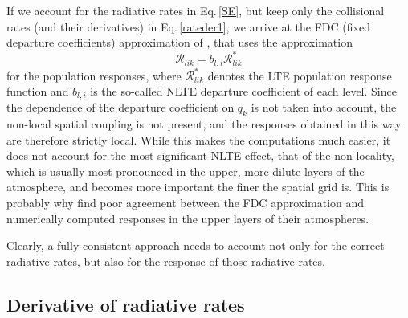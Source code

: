 \documentclass{aa}
\begin{document}
If we account for the radiative rates in Eq.\,\ref{SE}, but keep only the collisional rates (and their derivatives) in Eq.\,\ref{rateder1}, we arrive at the FDC (fixed departure coefficients) approximation of \citet{HectorI}, that uses the approximation
\begin{equation}
{\mathcal R}_{lik} = b_{l,i}  {\mathcal R}^*_{lik}
\end{equation}
for the population responses, where ${\mathcal R}^*_{lik}$ denotes the LTE population response function and $b_{l,i}$ is the so-called NLTE departure coefficient of each level. Since the dependence of the departure coefficient on $q_k$ is not taken into account, the non-local spatial coupling is not present, and the responses obtained in this way are therefore strictly local. While this makes the computations much easier, it does not account for the most significant NLTE effect, that of the non-locality, which is usually most pronounced in the upper, more dilute layers of the atmosphere, and becomes more important the finer the spatial grid is. This is probably why \citet{HectorI} find poor agreement between the FDC approximation and numerically computed responses in the upper layers of their atmospheres.

Clearly, a fully consistent approach needs to account not only for the correct radiative rates, but also for the response of those radiative rates.

\subsection{Derivative of radiative rates}
\label{radiative_rates}
\end{document}
